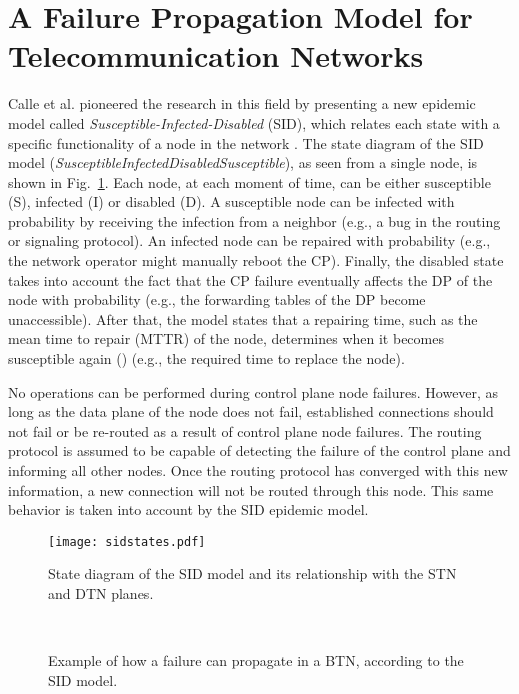 \documentclass[10pt,draftclsnofoot,onecolumn,journal]{IEEEtran}
\begin{document}
\section{A Failure Propagation Model for Telecommunication Networks\label{epidemicsontelecom}}

Calle et al. pioneered the research in this field by presenting a new epidemic model called \emph{Susceptible-Infected-Disabled} (SID), which relates each state with a specific functionality of a node in the network \cite{calle2010multiple}. The state diagram of the SID model (\textit{SusceptibleInfectedDisabledSusceptible}), as seen from a single node, is shown in Fig.~\ref{fig:sid}. Each node, at each moment of time, can be either susceptible (S), infected (I) or disabled (D). A susceptible node can be infected with probability  by receiving the infection from a neighbor (e.g., a bug in the routing or signaling protocol). An infected node can be repaired with probability  (e.g., the network operator might manually reboot the CP). Finally, the disabled state takes into account the fact that the CP failure eventually affects the DP of the node with probability  (e.g., the forwarding tables of the DP become unaccessible). After that, the model states that a repairing time, such as the mean time to repair (MTTR) of the node, determines when it becomes susceptible again () (e.g., the required time to replace the node). 

No operations can be performed during control plane node failures. However, as long as the data plane of the node does not fail, established connections should not fail or be re-routed as a result of control plane node failures. The routing protocol is assumed to be capable of detecting the failure of the control plane and informing all other nodes. Once the routing protocol has converged with this new information, a new connection will not be routed through this node. This same behavior is taken into account by the SID epidemic model.

\begin{figure}
\centering
\texttt{[image: sidstates.pdf]}
\caption{State diagram of the SID model and its relationship with the STN and DTN planes.}
\label{fig:sid}
\end{figure}

\begin{figure}
 \centering
\\
  \caption{Example of how a failure can propagate in a BTN, according to the SID model.}
  \label{fig:failurepropagation}
\end{figure}
\end{document}
